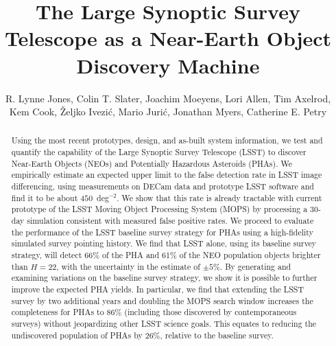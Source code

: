\documentclass[12pt,preprint]{aastex}
\begin{document}
\title{The Large Synoptic Survey Telescope as a Near-Earth Object Discovery Machine}

\author{R. Lynne Jones,
Colin T. Slater,
Joachim Moeyens,
Lori Allen,
Tim Axelrod,
Kem Cook,
\v{Z}eljko Ivezi\'{c},
Mario Juri\'{c},
Jonathan Myers,
Catherine E. Petry
}

\begin{abstract}
Using the most recent prototypes, design, and as-built system information, we test and quantify the capability of the Large Synoptic Survey Telescope (LSST) to discover Near-Earth Objects (NEOs) and Potentially Hazardous Asteroids (PHAs).
We empirically estimate an expected upper limit to the false detection rate in LSST image differencing, using measurements on DECam data and prototype LSST software and find it to be about $450$~deg$^{-2}$. We show that this rate is already tractable with current prototype of the LSST Moving Object Processing System (MOPS) by processing a 30-day simulation consistent with measured false positive rates.
We proceed to evaluate the performance of the LSST baseline survey strategy for  PHAs using a high-fidelity simulated survey pointing history. 
We find that LSST alone, using its baseline survey strategy, will detect 66\% of the PHA and 61\% of the NEO population objects brighter than $H=22$, with the uncertainty in the estimate of $\pm5$\%. By generating and examining variations on the baseline survey strategy, we show it is possible to further improve the expected PHA yields.
In particular, we find that extending the LSST survey by two additional years and doubling the MOPS search window increases the completeness for PHAs to 86\% (including those discovered by contemporaneous surveys) without jeopardizing other LSST science goals. This equates to reducing the undiscovered population of PHAs by 26\%, relative to the baseline survey.
\end{abstract}
\end{document}
